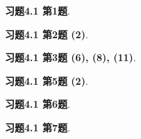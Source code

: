 \renewcommand{\newpageorvspace}{\vspace{2em}}

\date{第十次作业}



\maketitle

{\bf 习题4.1 第1题}.

\newpageorvspace

{\bf 习题4.1 第2题 (2)}.

\newpageorvspace

{\bf 习题4.1 第3题 (6), (8), (11)}.

\newpageorvspace

{\bf 习题4.1 第5题 (2)}.

\newpageorvspace

{\bf 习题4.1 第6题}.

\newpageorvspace

{\bf 习题4.1 第7题}.



